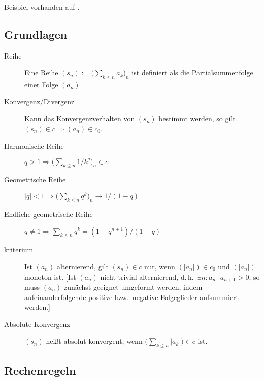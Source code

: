 \CheckedBox{} Beispiel vorhanden auf .

\subsection{Grundlagen}
\begin{description}
    \item[Reihe] 
        Eine Reihe $(s_n) := \bigl(\sum_{k \leq n} a_k\bigr)_n$ ist definiert als die Partialsummenfolge einer Folge $(a_n)$.
    \item[Konvergenz/Divergenz] 
        Kann das Konvergenzverhalten von $(s_n)$ bestimmt werden, so gilt $(s_n) \in c \Rightarrow (a_n) \in c_0$.
    \item [Harmonische Reihe] 
        $q>1 \Rightarrow \bigl(\sum_{k \leq n} 1/k^q\bigr)_n \in c$
    \item [Geometrische Reihe] 
        $\lvert q \rvert<1 \Rightarrow \bigl(\sum_{k \leq n} q^k\bigr)_n \to 1/(1-q)$
    \item [Endliche geometrische Reihe] 
        $q\neq1 \Rightarrow \sum_{k \leq n} q^k = (1-q^{n+1})/(1-q)$
    \item [kriterium] 
        Ist $(a_n)$ alternierend, gilt $(s_n) \in c$ nur, wenn $(\lvert a_n \rvert) \in c_0$ und $(\lvert a_n \rvert)$ monoton ist.
        [Ist $(a_n)$ nicht trivial alternierend, d.\,h.~$\exists n : a_n \cdot a_{n+1} > 0$, so muss $(a_n)$ zunächst geeignet umgeformt werden, indem aufeinanderfolgende positive bzw.~negative Folgeglieder aufsummiert werden.]
    \item [Absolute Konvergenz] 
        $(s_n)$ heißt absolut konvergent, wenn $\bigl( \sum_{k \leq n} \lvert a_k \rvert \bigr) \in c$ ist.
\end{description}

\subsection{Rechenregeln}

